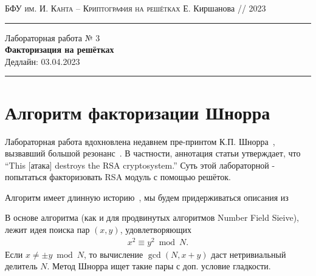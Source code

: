 \documentclass[11pt]{exam}
\theoremstyle{definition}
\begin{document}
	{\noindent
		\textsc{БФУ им. И. Канта -- Криптография на решётках}
		\hfill {Е. Киршанова // 2023\\}
\hrule
\begin{center}
	{\LARGE
			Лабораторная работа № 3 \\[5pt]
			\textbf{Факторизация на решётках} \\[10pt]
	 	{Дедлайн: 03.04.2023} 
 	} 
\end{center}
\hrule \vspace{5mm}
	
	\thispagestyle{empty}
	
	\vspace{0.2cm}
	\section{Алгоритм факторизации Шнорра}
	
	Лабораторная работа вдохновлена недавнем пре-принтом К.П. Шнорра~\cite{Schnorr21}, вызвавший большой резонанс~\cite{twitter1,twitter2,stackexchange}. В частности, аннотация статьи утверждает, что ``This [атака] destroys the RSA cryptosystem.'' Суть этой лабораторной - попытаться факторизовать RSA модуль с помощью решёток. 
	
	Алгоритм имеет длинную историю~\cite{leogit}, мы будем придерживаться описания из~\cite{vera10}
	
	В основе алгоритма (как и для продвинутых алгоритмов Number Field Sieive), лежит идея поиска пар $(x,y)$, удовлетворяющих 
	\begin{align} \label{eq:congruence}
	x^2 \equiv y^2 \bmod N.
	\end{align}
	\noindent Если $x \neq \pm y \bmod N$, то вычисление $\gcd(N, x+y)$ даст нетривиальный делитель $N$. Метод Шнорра ищет такие пары с доп. условие гладкости.
	
}
\end{document}

